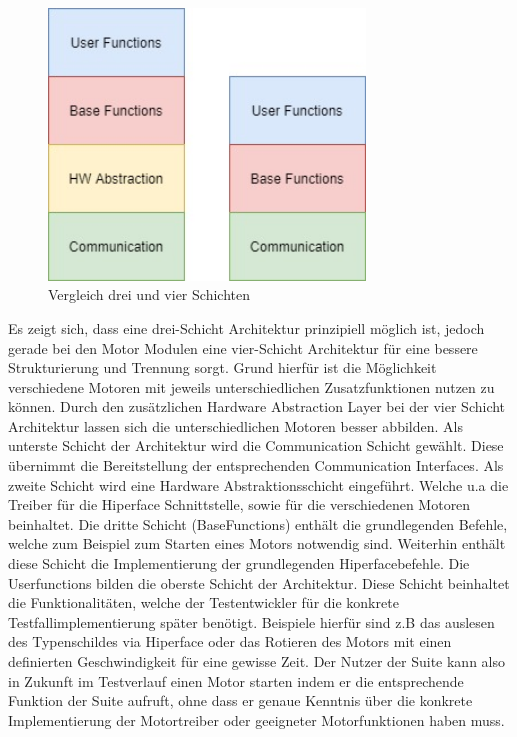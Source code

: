 \begin{figure}[h]
  \centering
   \includegraphics[width=0.75\textwidth]{img/VergleichSchichten.jpg} 
   \caption{Vergleich drei und vier Schichten}
   \label{fig:VergleichSchichten.jpg}
\end{figure}
Es zeigt sich, dass eine drei-Schicht Architektur prinzipiell möglich ist, jedoch gerade bei den Motor Modulen eine vier-Schicht Architektur für eine bessere Strukturierung und Trennung sorgt. Grund hierfür ist die Möglichkeit verschiedene Motoren mit jeweils unterschiedlichen Zusatzfunktionen nutzen zu können. Durch den zusätzlichen Hardware Abstraction Layer bei der vier Schicht Architektur lassen sich die unterschiedlichen Motoren besser abbilden.
Als unterste Schicht der Architektur wird die Communication Schicht gewählt. Diese übernimmt die Bereitstellung der entsprechenden Communication Interfaces. Als zweite Schicht wird eine Hardware Abstraktionsschicht eingeführt. Welche u.a die Treiber für die Hiperface Schnittstelle, sowie für die verschiedenen Motoren beinhaltet.
Die dritte Schicht (BaseFunctions) enthält die grundlegenden Befehle, welche zum Beispiel zum Starten eines Motors notwendig sind. Weiterhin enthält diese Schicht die Implementierung der grundlegenden Hiperfacebefehle. Die Userfunctions bilden die oberste Schicht der Architektur. Diese Schicht beinhaltet die Funktionalitäten, welche der Testentwickler für die konkrete Testfallimplementierung später benötigt. Beispiele hierfür sind z.B das auslesen des Typenschildes via Hiperface oder das Rotieren des Motors mit einen definierten Geschwindigkeit für eine gewisse Zeit. Der Nutzer der Suite kann also in Zukunft im Testverlauf einen Motor starten indem er die entsprechende Funktion der Suite aufruft, ohne dass er genaue Kenntnis über die konkrete Implementierung der Motortreiber oder geeigneter Motorfunktionen haben muss.
